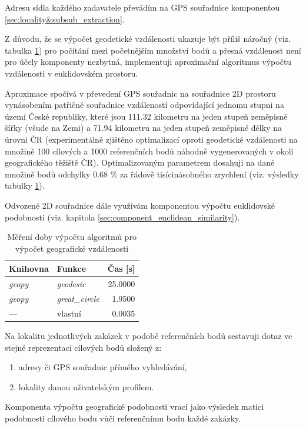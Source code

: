 \documentclass[thesis=M,czech]{FITthesis}[2019/12/23]
\begin{document}
Adresu sídla každého zadavatele převádím na GPS souřadnice komponentou \ref{sec:locality&subsub_extraction}.

Z důvodu, že se výpočet geodetické vzdálenosti ukazuje být příliš náročný (viz. tabulka \ref{table:experiment_similarity3}) pro počítání mezi početnějším množství bodů a přesná vzdálenost není pro účely komponenty nezbytná, implementuji aproximační algoritmus výpočtu vzdálenosti v euklidovském prostoru. 

Aproximace spočívá v převedení GPS souřadnic na souřadnice 2D prostoru vynásobením patřičné souřadnice vzdáleností odpovídající jednomu stupni na území České republiky, které jsou 111.32 kilometru na jeden stupeň zeměpisné šířky (všude na Zemi) a 71.94 kilometru na jeden stupeň zeměpisné délky na úrovni ČR (experimentálně zjištěno optimalizací oproti geodetické vzdálenosti na množině 100 cílových a 1000 referenčních bodů náhodně vygenerovaných v okolí geografického těžiště ČR). Optimalizovaným parametrem dosahuji na dané množině bodů odchylky 0.68 \%  za řádově tisícinásobného zrychlení (viz. výsledky tabulky \ref{table:experiment_similarity3}).

Odvozené 2D souřadnice dále využívám komponentou výpočtu euklidovské podobnosti (viz. kapitola \ref{sec:component_euclidean_similarity}).

\begin{table}[h!]
\centering
\begin{tabular}{ |l|l|r| }
\hline
Knihovna & Funkce & Čas [s] \\\hline
\hline
\textit{geopy} & \textit{geodesic} & 25.0000 \\
\textit{geopy} & \textit{great\_circle} & 1.9500 \\
--- & vlastní & 0.0035 \\\hline
\end{tabular}
\caption{Měření doby výpočtu algoritmů pro výpočet geografické vzdálenosti}
\label{table:experiment_similarity3}
\end{table}


Na lokalitu jednotlivých zakázek v podobě referenčních bodů sestavuji dotaz ve stejné reprezentaci cílových bodů složený z:
\begin{enumerate}
    \item adresy či GPS souřadnic přímého vyhledávání,
    \item lokality danou uživatelským profilem.
\end{enumerate}

Komponenta výpočtu geografické podobnosti vrací jako výsledek matici podobnosti cílového bodu vůči referenčnímu bodu každé zakázky.
\end{document}
